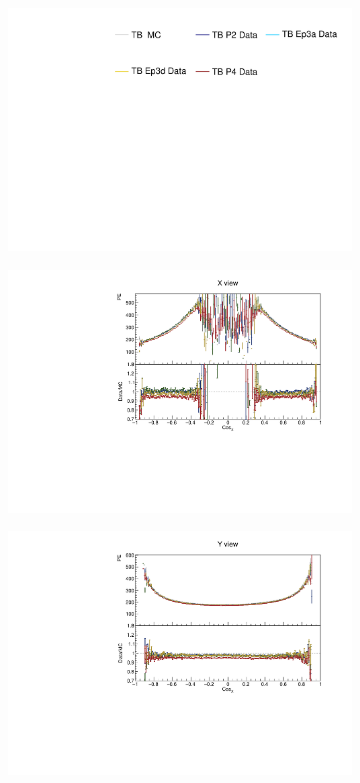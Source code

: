 \begin{figure}[!ht]
  \begin{subfigure}{\textwidth}
  \centering
    \includegraphics[height=0.2\linewidth]{essentialsec_tb/legend.pdf}
  \end{subfigure}
  \vspace*{2mm}

  \begin{subfigure}{0.5\textwidth}
    \includegraphics[width=\linewidth]{PlotsAngularDistribution/pe_cosx_x.pdf}
  \end{subfigure}
  \begin{subfigure}{0.5\textwidth}
    \includegraphics[width=\linewidth]{PlotsAngularDistribution/pe_cosx_y.pdf}

\end{subfigure}
\end{figure}
